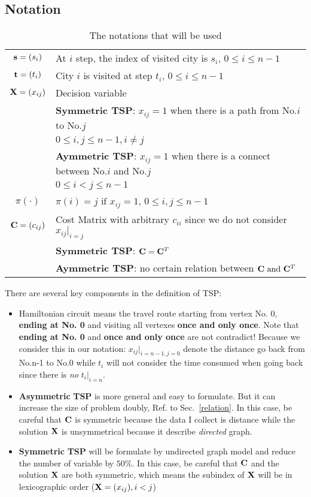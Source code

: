 \documentclass{mcmthesis}
\begin{document}
\subsection{Notation}	 
\begin{table}[H]
	\centering
	{\begin{tabular}{c|l} 
	\hline
	$\mathbf{s} = (s_i)$ & At $i$ step, the index of visited city is $s_i$, $ 0 \le i \le n-1$\\
	$\mathbf{t}= (t_i)$ & City $i$ is visited at step $t_i$, $ 0 \le i \le n-1$\\ \hline \hline
	$\mathbf{X} = (x_{i j} )$ & Decision variable   \\
	& \textbf{Symmetric TSP}:  $x_{ij}=1$ when there is a path  from No.$i$ to No.$j$ \\
	& \qquad\qquad\qquad\qquad $0 \le i,j \le n-1, i\ne j$ \\
	& \textbf{Aymmetric TSP}:  $x_{ij}=1$ when there is a connect between  No.$i$ and No.$j$\\
	& \qquad\qquad\qquad\qquad  $0 \le i<j \le n-1 $ \\ \hline \hline
	$\pi(\cdot )$ & $\pi(i)=j  \text{ if } x_{i j}=1$, $ 0 \le i,j \le n-1$ \\ \hline \hline
	$\mathbf{C}=(c_{ij})$ & Cost Matrix with arbitrary  $c_{ii}$  since we do not consider $x_{ij}|_{i=j}$ \\ 
	& \textbf{Symmetric TSP}:  $\mathbf{C}=\mathbf{C}^T$ \\
	&  \textbf{Aymmetric TSP}: no certain relation between  $\mathbf{C} \text{ and } \mathbf{C}^T$ \\
	\hline
	\end{tabular}
	\caption{The notations that will be used}
	\label{tab:ok}}
\end{table}

There are several key components in the definition of TSP:
\begin{itemize}[noitemsep,nolistsep]
	\item Hamiltonian circuit means the travel route starting from vertex No. 0, \textbf{ending at No. 0} and visiting all vertexes \textbf{once and only once}. Note that \textbf{ending at No. 0} and  \textbf{once and only once} are not contradict! Because we consider this in our notation: $x_{ij}|_{i=n-1,j=0}$ denote the distance  go back from No.n-1 to No.0 while  $t_i$ will not consider the time consumed when going back since there is \textit{no} $t_i|_{i=n}$.
	\item  \textbf{Asymmetric} \textbf{TSP} is more general and easy to formulate. But it can increase the size of problem doubly, Ref. to Sec.~\vref{relation}. In this case,  be careful that $\mathbf{C}$ is symmetric because the data I collect is distance while the solution $\mathbf{X}$ is unsymmetrical because it describe \textit{directed} graph.
	\item \textbf{Symmetric} \textbf{TSP} will be formulate by undirected graph model and reduce the number of variable by $50\%$. In this case, be careful that $\mathbf{C}$ and the solution $\mathbf{X}$ are both symmetric, which means the subindex of  $\mathbf{X}$  will be in lexicographic order (\ie $\mathbf{X} = (x_{i j} ), i<j$)
\end{itemize} 
\end{document}
